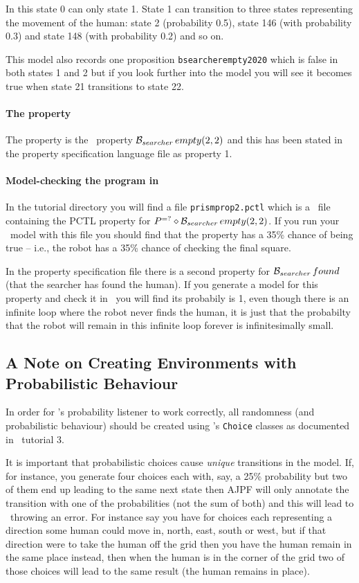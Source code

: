 \documentclass[a4]{article}
\begin{document}
In this state 0 can only state 1.  State 1 can transition to three states representing the movement of the human: state 2 (probability 0.5), state 146 (with probability 0.3) and state 148 (with probability 0.2) and so on.

This model also records one proposition \texttt{bsearcherempty2020} which is false in both states 1 and 2 but if you look further into the model you will see it becomes true when state 21 transitions to state 22.

\paragraph{The property} The property is the \ajpf\ property $\mathrm{{\cal B}}_{searcher} \, empty(2, 2)$ and this has been stated in the property specification language file as property 1. 

\paragraph{Model-checking the program in \prism}  In the tutorial directory you will find a file \texttt{prismprop2.pctl} which is a \prism\ file containing the PCTL property for $P^{=?}\diamond \mathrm{{\cal B}}_{searcher} \, empty(2, 2)$.  If you run your \prism\ model with this file you should find that the property has a 35\% chance of being true -- i.e., the robot has a 35\% chance of checking the final square.

In the property specification file there is a second property for $\mathrm{{\cal B}}_{searcher} \, found$ (that the searcher has found the human).  If you generate a model for this property and check it in \prism\ you will find its probabily is 1, even though there is an infinite loop where the robot never finds the human, it is just that the probabilty that the robot will remain in this infinite loop forever is infinitesimally small.

\subsection{A Note on Creating Environments with Probabilistic Behaviour}

In order for \ajpf's probability listener to work correctly, all randomness (and probabilistic behaviour) should be created using \ail's \texttt{Choice} classes as documented in \ail\ tutorial 3.

It is important that probabilistic choices cause \emph{unique} transitions in the model.  If, for instance, you generate four choices each with, say, a 25\% probability but two of them end up leading to the same next state then AJPF will only annotate the transition with one of the probabilities (not the sum of both) and this will lead to \prism\ throwing an error.  For instance say you have for choices each representing a direction some human could move in, north, east, south or west, but if that direction were to take the human off the grid then you have the human remain in the same place instead, then when the human is in the corner of the grid two of those choices will lead to the same result (the human remains in place).
\end{document}
